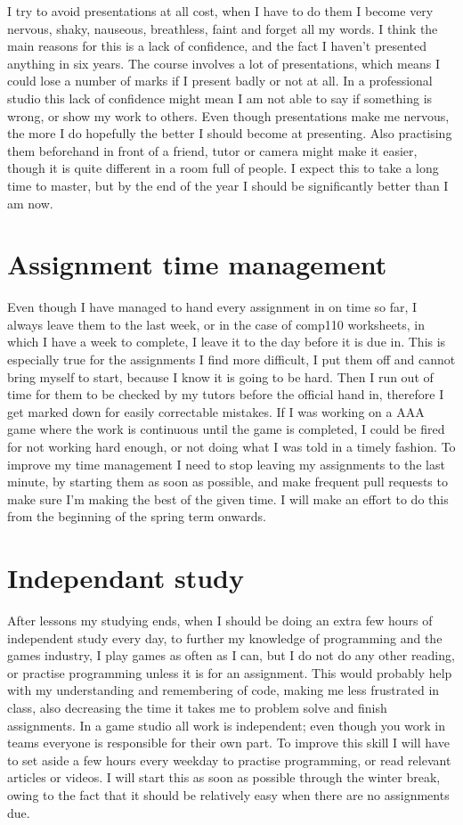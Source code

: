 \documentclass{scrartcl}
\begin{document}
I try to avoid presentations at all cost, when I have to do them I become very nervous, shaky, nauseous, breathless, faint and forget all my words. I think the main reasons for this is a lack of confidence, and the fact I haven't presented anything in six years. The course involves a lot of presentations, which means I could lose a number of marks if I present badly or not at all. In a professional studio this lack of confidence might mean I am not able to say if something is wrong, or show my work to others. Even though presentations make me nervous, the more I do hopefully the better I should become at presenting. Also practising them beforehand in front of a friend, tutor or camera might make it easier, though it is quite different in a room full of people. I expect this to take a long time to master, but by the end of the year I should be significantly better than I am now.

\section{Assignment time management}

Even though I have managed to hand every assignment in on time so far, I always leave them to the last week, or in the case of comp110 worksheets, in which I have a week to complete, I leave it to the day before it is due in. This is especially true for the assignments I find more difficult, I put them off and cannot bring myself to start, because I know it is going to be hard. Then I run out of time for them to be checked by my tutors before the official hand in, therefore I get marked down for easily correctable mistakes. If I was working on a AAA game where the work is continuous until the game is completed, I could be fired for not working hard enough, or not doing what I was told in a timely fashion. To improve my time management I need to stop leaving my assignments to the last minute, by starting them as soon as possible, and make frequent pull requests to make sure I'm making the best of the given time. I will make an effort to do this from the beginning of the spring term onwards.

\section{Independant study}

After lessons my studying ends, when I should be doing an extra few hours of independent study every day, to further my knowledge of programming and the games industry, I play games as often as I can, but I do not do any other reading, or practise programming unless it is for an assignment. This would probably help with my understanding and remembering of code, making me less frustrated in class, also decreasing the time it takes me to problem solve and finish assignments. In a game studio all work is independent; even though you work in teams everyone is responsible for their own part. To improve this skill I will have to set aside a few hours every weekday to practise programming, or read relevant articles or videos. I will start this as soon as possible through the winter break, owing to the fact that it should be relatively easy when there are no assignments due.
\end{document}
